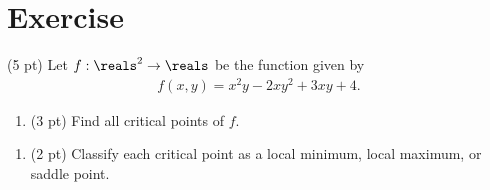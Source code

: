 \section{Exercise}

(5 pt) Let $f: \reals^{2} \rightarrow \reals$ be the function given by
\begin{align*}
f(x,y)
=
x^{2} y - 2 x y^{2} + 3 x y + 4.
\end{align*}
\begin{enumerate}[label=(\alph*)]
\item (3 pt) Find all critical points of $f$. 
\end{enumerate}

\spaceSolution{4in}{}


\begin{enumerate}[resume,label=(\alph*)]
\item (2 pt) Classify each critical point as a local minimum, local maximum, or saddle point.
\end{enumerate}

\spaceSolution{1in}{}
